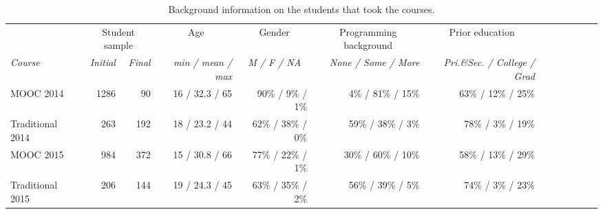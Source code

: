 \documentclass{sigchi}
\begin{document}
\begin{table}[thb]
  \centering
  \begin{tabular}{l r r r r r r r r r r r r}

    &   \multicolumn{2}{c}{\small{Student sample}} & 
        \multicolumn{1}{c}{\small{Age}} & 
        \multicolumn{1}{c}{\small{Gender}} & 
        \multicolumn{1}{c}{\small{Programming background}} & 
        \multicolumn{1}{c}{\small{Prior education}}\\
        
        {\small\textit{Course}} & 
        {\small \textit{Initial}} & 
        {\small \textit{Final}} & 
        {\small \textit{min / mean / max}} & 
        \multicolumn{1}{c}{\small \textit{M / F / NA}} & 
        {\small \textit{None / Some / More }} & 
        {\small \textit{Pri.\&Sec. / College / Grad }}\\
    \midrule
    MOOC 2014 & 1286 & 90 & 16 / 32.3 / 65 & 90\% / 9\% / 1\% & 4\% / 81\% / 15\% & 63\% / 12\% / 25\%\\
    Traditional 2014 & 263  & 192 & 18 / 23.2 / 44 & 62\% / 38\% / 0\% & 59\% / 38\% / 3\%  & 78\% / 3\%  / 19\% \\
    MOOC 2015 & 984  & 372 & 15 / 30.8 / 66 & 77\% / 22\% / 1\% & 30\% / 60\% / 10\%  & 58\% / 13\% / 29\%\\
    Traditional 2015 & 206 & 144 & 19 / 24.3 / 45 & 63\% / 35\% / 2\% & 56\% / 39\% / 5\% & 74\% / 3\%  / 23\% \\
  \end{tabular}
  \caption{Background information on the students that took the courses.}~\label{tab:participantstatistics}\vspace{-16pt}
\end{table}



\end{document}
